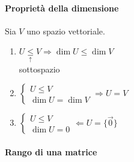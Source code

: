 \paragraph{Proprietà della dimensione} Sia $V$ uno spazio vettoriale.
\begin{enumerate}
    \item $U\underset{\uparrow}{\leq} V\Longrightarrow \dim U\leq \dim{V}$\\
        sottospazio\\
    \item 
        $
        \begin{cases}
            U\leq V\\
            \dim U =\dim V
        \end{cases}
        \Longrightarrow U=V
        $
    \item 
        $ 
        \begin{cases}
            U\leq V\\
            \dim U=0
        \end{cases}
        \Longleftarrow U=\{\vec{0}\}
        $
\end{enumerate}

\paragraph{Rango di una matrice}\hspace{1cm} 

